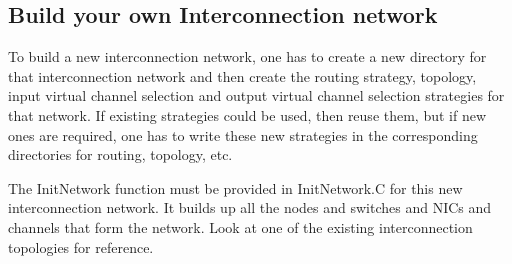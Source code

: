 \subsection{Build your own Interconnection network}
To build a new interconnection network, one has to create a new directory
for that interconnection network and then create the routing strategy,
topology, input virtual channel selection and output virtual channel selection
strategies for that network. If existing strategies could be used, then
reuse them, but if new ones are required, one has to write these new
strategies in the corresponding directories for routing, topology, etc.

The InitNetwork function must be provided in InitNetwork.C for this 
new interconnection network. It builds up all the nodes and 
switches and NICs and channels that form the network. Look at one
of the existing interconnection topologies for reference.

